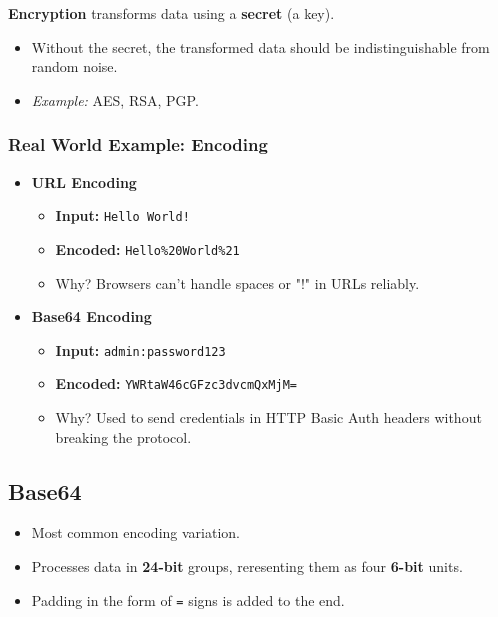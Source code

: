 \documentclass[12pt, letterpaper]{article}
\begin{document}
\bigskip

\textbf{Encryption} transforms data using a \textbf{secret} (a key).

\begin{itemize}
    \item Without the secret, the transformed data should be indistinguishable from random noise.
    \item \textit{Example:} AES, RSA, PGP.
\end{itemize}

\subsubsection*{Real World Example: Encoding}

\begin{itemize}
    \item \textbf{URL Encoding}
        \begin{itemize}
            \item \textbf{Input:} \texttt{Hello World!}
            \item \textbf{Encoded:} \texttt{Hello\%20World\%21}
            \item Why? Browsers can't handle spaces or "!" in URLs reliably.
        \end{itemize}
    \item \textbf{Base64 Encoding}
        \begin{itemize}
            \item \textbf{Input:} \texttt{admin:password123}
            \item \textbf{Encoded:} \texttt{YWRtaW46cGFzc3dvcmQxMjM=}
            \item Why? Used to send credentials in HTTP Basic Auth headers without breaking the protocol.
        \end{itemize}
\end{itemize}

\subsection*{Base64}

\begin{itemize}
    \item Most common encoding variation.
    \item Processes data in \textbf{24-bit} groups, reresenting them as four \textbf{6-bit} units.
    \item Padding in the form of \texttt{=} signs is added to the end.
\end{itemize}
\end{document}
